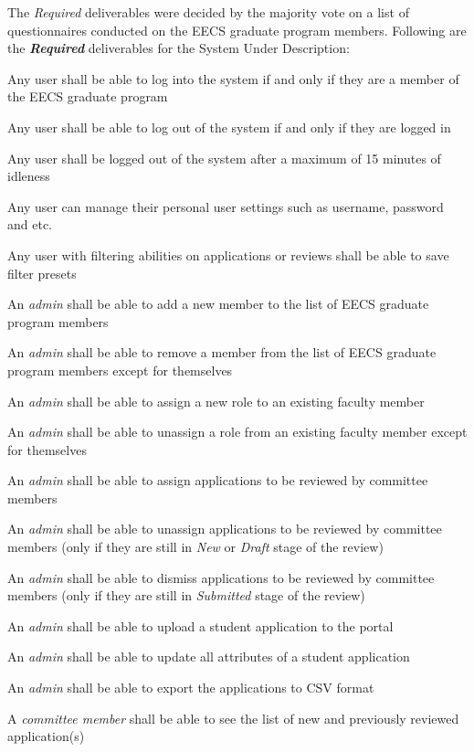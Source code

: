 \documentclass[fontsize=12pt,paper=letter,twoside]{scrartcl}
\begin{document}
The \emph{Required} deliverables were decided by the majority vote on a list of questionnaires conducted on the EECS graduate program members. Following are the \textbf{\emph{Required}} deliverables for the System Under Description:\\

\begin{mylist}
\item Any user shall be able to log into the system if and only if they are a member of the EECS graduate program
\item Any user shall be able to log out of the system if and only if they are logged in
\item Any user shall be logged out of the system after a maximum of 15 minutes of idleness
\item Any user can manage their personal user settings such as username, password and etc.
\item Any user with filtering abilities on applications or reviews shall be able to save filter presets
\item An \emph{admin} shall be able to add a new member to the list of EECS graduate program members
\item An \emph{admin} shall be able to remove a member from the list of EECS graduate program members except for themselves
\item An \emph{admin} shall be able to assign a new role to an existing faculty member
\item An \emph{admin} shall be able to unassign a role from an existing faculty member except for themselves
\item An \emph{admin} shall be able to assign applications to be reviewed by committee members
\item An \emph{admin} shall be able to unassign applications to be reviewed by committee members (only if they are still in \emph{New} or \emph{Draft} stage of the review)
\item An \emph{admin} shall be able to dismiss applications to be reviewed by committee members (only if they are still in \emph{Submitted} stage of the review)
\item An \emph{admin} shall be able to upload a student application to the portal
\item An \emph{admin} shall be able to update all attributes of a student application
\item An \emph{admin} shall be able to export the applications to CSV format
\item A \emph{committee member} shall be able to see the list of new and previously reviewed application(s)

\end{mylist}
\end{document}
